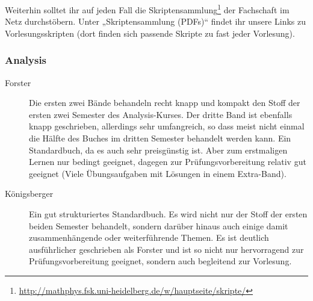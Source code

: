 Weiterhin solltet ihr auf jeden Fall die Skriptensammlung\footnote{\url{http://mathphys.fsk.uni-heidelberg.de/w/hauptseite/skripte/}}
der Fachschaft im Netz durchstöbern. Unter „Skriptensammlung (PDFs)“ findet
ihr unsere Links zu Vorlesungsskripten (dort finden sich passende Skripte zu fast
jeder Vorlesung).

\subsubsection{Analysis}
\begin{description}

\item[Forster] {Die ersten zwei
Bände behandeln recht knapp und kompakt den Stoff der ersten
zwei Semester des Analysis-Kurses. Der dritte Band ist ebenfalls
knapp geschrieben, allerdings sehr umfangreich, so dass meist
nicht einmal die Hälfte des Buches im dritten Semester behandelt
werden kann. Ein Standardbuch, da es auch sehr preisgünstig ist.
Aber zum erstmaligen Lernen nur bedingt geeignet,
dagegen zur Prüfungsvorbereitung relativ gut geeignet (Viele
Übungsaufgaben mit Lösungen in einem Extra-Band).}


\item[Königsberger]{
Ein gut strukturiertes Standardbuch. Es wird nicht nur der Stoff der
ersten beiden Semester behandelt, sondern darüber hinaus auch einige
damit zusammenhängende oder weiterführende Themen. Es ist
deutlich ausführlicher geschrieben als Forster und ist so nicht nur
hervorragend zur Prüfungsvorbereitung geeignet, sondern auch
begleitend zur Vorlesung.}



\end{description}
